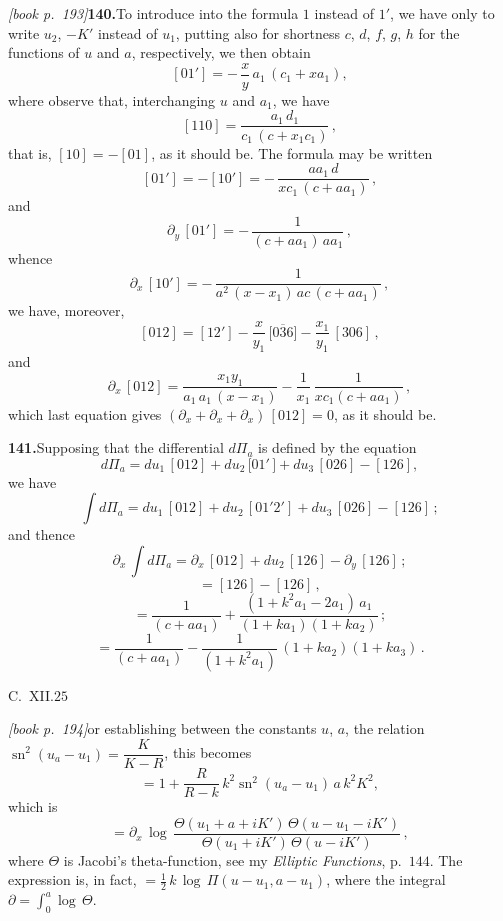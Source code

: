 \documentclass[11pt,a4paper]{article}
\DeclareMathOperator{\sn}{sn}
\begin{document}
\medskip\noindent\textit{[book p.~193]}\quad \textbf{140.}\quad To introduce into the formula $1$ instead of $1'$, we have only to write $u_2$, $-K'$ instead of $u_1$, putting also for shortness $c$, $d$, $f$, $g$, $h$ for the functions of $u$ and $a$, respectively, we then obtain
\[
[01'] = -\,\frac{x}{y}\,a_1\,(c_1 + x a_1),
\]
where observe that, interchanging $u$ and $a_1$, we have
\[
[110] = \frac{a_1\,d_1}{c_1\,(c + x_1c_1)}\,,
\]
that is, $[10] = -[01]$, as it should be. The formula may be written
\[
[01'] = -[10'] = -\,\frac{a a_1\,d}{x c_1\,(c + a a_1)}\,,
\]
and
\[
\partial_y\,[01'] = -\,\frac{1}{(c + a a_1)\,a a_1}\,,
\]
whence
\[
\partial_x\,[10'] = -\,\frac{1}{a^2\,(x - x_1)\,a c\,(c + a a_1)}\,,
\]
we have, moreover,
\[
[012] = [12'] - \dfrac{x}{y_1}\,\bigl[\overline{036}\bigr] - \dfrac{x_1}{y_1}\,[306]\,,
\]
and
\[
\partial_x\,[012] = \frac{x_1y_1}{a_1\,a_1\,(x - x_1)} - \frac{1}{x_1}\,\frac{1}{xc_1(c + a a_1)}\,,
\]
which last equation gives $(\partial_x + \partial_x + \partial_x)\,[012] = 0$, as it should be.

\medskip\noindent\textbf{141.}\quad Supposing that the differential $d\Pi_a$ is defined by the equation
\[
d\Pi_a = du_1\,[012] + du_2\,\bigl[01'\,\bigr] + du_3\,[026] - [126],
\]
we have
\[
\int d\Pi_a = du_1\,[012] + du_2\,[01'2'] + du_3\,[026] - [126]\,;
\]
and thence
\[
\partial_x\,\int d\Pi_a = \partial_x\,[012] + du_2\,[126] - \partial_y\,[126]\,;
\]
\[
= [126] - [126]\,,
\]
\[
= \frac{1}{(c + a a_1)} + \frac{(1 + k^2 a_1 - 2 a_1)\,a_1}{(1 + ka_1)(1 + ka_2)}\,;
\]
\[
= \frac{1}{(c + a a_1)} - \frac{1}{(1 + k^2 a_1)}\,(1 + ka_2)(1 + ka_3)\,.
\]

\hfill C.\ XII.\hfill $25$

\medskip\noindent\textit{[book p.~194]}\quad or establishing between the constants $u$, $a$, the relation $\sn^2(u_a - u_1) = \dfrac{K}{K - R}$, this becomes
\[
= 1 + \frac{R}{R - k}\,k^2 \sn^2(u_a - u_1)\,a\,k^2 K^2,
\]
which is
\[
= \partial_x\,\log\,\frac{\Theta(u_1 + a + iK')\,\Theta(u - u_1 - iK')}{\Theta(u_1 + iK')\,\Theta(u - iK')}\,,
\]
where $\Theta$ is Jacobi's theta-function, see my \textit{Elliptic Functions}, p.\ $144$. The expression is, in fact, $= \tfrac{1}{2}\,k\,\log\,\Pi(u - u_1, a - u_1)$, where the integral $\partial = \int_0^a\log\,\Theta$.
\end{document}
